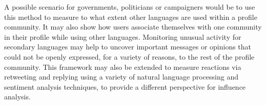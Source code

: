 \documentclass{llncs}
\begin{document}
A possible scenario for governments, politicians or campaigners would
be to use this method to measure to what extent other languages are
used within a profile community. It may also show how users associate
themselves with one community in their profile while using other
languages. Monitoring unusual activity for secondary languages may
help to uncover important messages or opinions that could not be
openly expressed, for a variety of reasons, to the rest of the profile
community. This framework may also be extended to measure reactions
via retweeting and replying using a variety of natural language
processing and sentiment analysis techniques, to provide a different
perspective for influence analysis.





\end{document}

